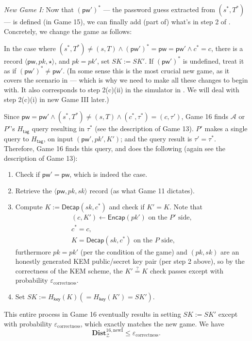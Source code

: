 \documentclass{article}
\theoremstyle{plain}
\theoremstyle{definition}
\theoremstyle{remark}
\newcommand{\adv}{\mathcal{A}}
\newcommand{\env}{\mathcal{Z}}
\newcommand{\Dist}{\mathbf{Dist}}
\newcommand{\Encap}{\mathsf{Encap}}
\newcommand{\Decap}{\mathsf{Decap}}
\newcommand{\Hkey}{H_\mathsf{key}}
\newcommand{\Htag}{H_\mathsf{tag}}
\newcommand{\pw}{\mathsf{pw}}
\begin{document}
{\color{blue}
\medskip\noindent\emph{New Game I:} Now that $(\pw')^*$ --- the password guess extracted from $(s^*,T^*)$ --- is defined (in Game 15), we can finally add (part of) what's in step 2 of . Concretely, we change the game as follows:

In the case where $(s^*,T^*) \neq (s,T) \land (\pw')^* = \pw = \pw' \land c^* = c$, there is a record $\langle\pw,pk,\star\rangle$, and $pk = pk'$, set $SK := SK'$. If $(\pw')^*$ is undefined, treat it as if $(\pw')^* \neq \pw'$. (In some sense this is the most crucial new game, as it covers the scenario in  --- which is why we need to make all these changes to begin with. It also corresponds to step 2(c)(ii) in the simulator in . We will deal with step 2(c)(i) in new Game III later.)

Since $\pw = \pw' \land (s^*,T^*) \neq (s,T) \land (c^*,\tau^*) = (c,\tau')$, Game 16 finds $\adv$ or $P'$'s $\Htag$ query resulting in $\tau^*$ (see the description of Game 13). $P'$ makes a single query to $\Htag$, on input $(\pw',pk',K')$; and the query result is $\tau' = \tau^*$. Therefore, Game 16 finds this query, and does the following (again see the description of Game 13):
\begin{enumerate}
  \item Check if $\pw' = \pw$, which is indeed the case.
  \item Retrieve the $\langle\pw,pk,sk\rangle$ record (as what Game 11 dictates).
  \item Compute $K := \Decap(sk,c^*)$ and check if $K' = K$. Note that
      \begin{gather*}
      (c,K') \gets \Encap(pk')\text{ on the }P'\text{ side}, \\
      c^* = c, \\
      K = \Decap(sk,c^*)\text{ on the }P\text{ side},
      \end{gather*}
      furthermore $pk = pk'$ (per the condition of the game) and $(pk,sk)$ are an honestly generated KEM public/secret key pair (per step 2 above), so by the correctness of the KEM scheme, the $K' \stackrel{?}{=} K$ check passes except with probability $\varepsilon_\text{correctness}$.
  \item Set $SK := \Hkey(K) (= \Hkey(K') = SK')$.
\end{enumerate}
This entire process in Game 16 eventually results in setting $SK := SK'$ except with probability $\varepsilon_\text{correctness}$, which exactly matches the new game. We have
\[
\Dist_\env^{16,\text{newI}} \leq \varepsilon_\text{correctness}.
\]
}
\end{document}
